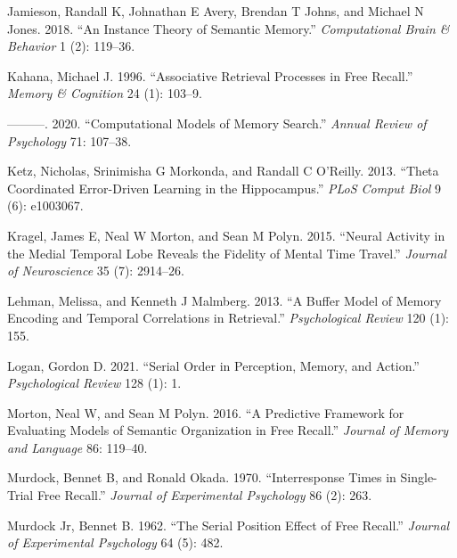 \documentclass[
  letterpaper,
  DIV=11]{article}
\newlength{\cslhangindent}
\newlength{\cslentryspacingunit} %
\newenvironment{CSLReferences}[2] %
 {%
  \setlength{\parindent}{0pt}
  \ifodd #1
  \let\oldpar\par
  \def\par{\hangindent=\cslhangindent\oldpar}
  \fi
  \setlength{\parskip}{#2\cslentryspacingunit}
 }%
 {}
\begin{document}
\begin{CSLReferences}{1}{0}
\leavevmode{}%
Jamieson, Randall K, Johnathan E Avery, Brendan T Johns, and Michael N
Jones. 2018. {``An Instance Theory of Semantic Memory.''}
\emph{Computational Brain \& Behavior} 1 (2): 119--36.

\leavevmode{}%
Kahana, Michael J. 1996. {``Associative Retrieval Processes in Free
Recall.''} \emph{Memory \& Cognition} 24 (1): 103--9.

\leavevmode{}%
---------. 2020. {``Computational Models of Memory Search.''}
\emph{Annual Review of Psychology} 71: 107--38.

\leavevmode{}%
Ketz, Nicholas, Srinimisha G Morkonda, and Randall C O'Reilly. 2013.
{``Theta Coordinated Error-Driven Learning in the Hippocampus.''}
\emph{PLoS Comput Biol} 9 (6): e1003067.

\leavevmode{}%
Kragel, James E, Neal W Morton, and Sean M Polyn. 2015. {``Neural
Activity in the Medial Temporal Lobe Reveals the Fidelity of Mental Time
Travel.''} \emph{Journal of Neuroscience} 35 (7): 2914--26.

\leavevmode{}%
Lehman, Melissa, and Kenneth J Malmberg. 2013. {``A Buffer Model of
Memory Encoding and Temporal Correlations in Retrieval.''}
\emph{Psychological Review} 120 (1): 155.

\leavevmode{}%
Logan, Gordon D. 2021. {``Serial Order in Perception, Memory, and
Action.''} \emph{Psychological Review} 128 (1): 1.

\leavevmode{}%
Morton, Neal W, and Sean M Polyn. 2016. {``A Predictive Framework for
Evaluating Models of Semantic Organization in Free Recall.''}
\emph{Journal of Memory and Language} 86: 119--40.

\leavevmode{}%
Murdock, Bennet B, and Ronald Okada. 1970. {``Interresponse Times in
Single-Trial Free Recall.''} \emph{Journal of Experimental Psychology}
86 (2): 263.

\leavevmode{}%
Murdock Jr, Bennet B. 1962. {``The Serial Position Effect of Free
Recall.''} \emph{Journal of Experimental Psychology} 64 (5): 482.


\end{CSLReferences}
\end{document}
